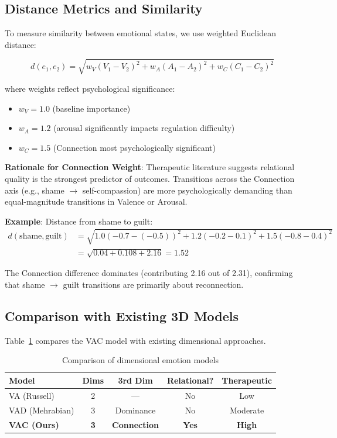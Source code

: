 \documentclass[10pt,twocolumn]{article}
\begin{document}
\subsection{Distance Metrics and Similarity}

To measure similarity between emotional states, we use weighted Euclidean distance:

$$d(e_1, e_2) = \sqrt{w_V(V_1 - V_2)^2 + w_A(A_1 - A_2)^2 + w_C(C_1 - C_2)^2}$$

where weights reflect psychological significance:
\begin{itemize}
    \item $w_V = 1.0$ (baseline importance)
    \item $w_A = 1.2$ (arousal significantly impacts regulation difficulty)
    \item $w_C = 1.5$ (Connection most psychologically significant)
\end{itemize}

\textbf{Rationale for Connection Weight}: Therapeutic literature suggests relational quality is the strongest predictor of outcomes. Transitions across the Connection axis (e.g., shame $\rightarrow$ self-compassion) are more psychologically demanding than equal-magnitude transitions in Valence or Arousal.

\textbf{Example}: Distance from shame to guilt:
\begin{align}
d(\text{shame}, \text{guilt}) &= \sqrt{1.0(-0.7 - (-0.5))^2 + 1.2(-0.2 - 0.1)^2 + 1.5(-0.8 - 0.4)^2} \nonumber\\
&= \sqrt{0.04 + 0.108 + 2.16} = 1.52
\end{align}

The Connection difference dominates (contributing 2.16 out of 2.31), confirming that shame $\rightarrow$ guilt transitions are primarily about reconnection.

\subsection{Comparison with Existing 3D Models}

Table~\ref{tab:model-comparison} compares the VAC model with existing dimensional approaches.

\begin{table}[h]
\centering
\caption{Comparison of dimensional emotion models}
\label{tab:model-comparison}
\small
\begin{tabular}{lcccc}
\toprule
\textbf{Model} & \textbf{Dims} & \textbf{3rd Dim} & \textbf{Relational?} & \textbf{Therapeutic} \\
\midrule
VA (Russell) & 2 & — & No & Low \\
VAD (Mehrabian) & 3 & Dominance & No & Moderate \\
\textbf{VAC (Ours)} & \textbf{3} & \textbf{Connection} & \textbf{Yes} & \textbf{High} \\
\bottomrule
\end{tabular}
\end{table}
\end{document}
